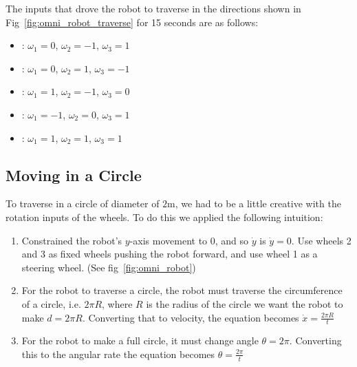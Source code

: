 \documentclass{article}
\begin{document}
The inputs that drove the robot to traverse in the directions shown in 
Fig~\ref{fig:omni_robot_traverse} for 15 seconds  are as follows:


\begin{itemize}
	\vspace{-0.4cm}
	\setlength{\itemsep}{0pt}
	\setlength{\parskip}{0pt}
	\setlength{\parsep}{0pt}
	
	\item{
		: 
		$\omega_{1} = 0$, $\omega_{2} = -1$, $\omega_{3} = 1$
	}
	\item{
		: 
		$\omega_{1} = 0$, $\omega_{2} = 1$, $\omega_{3} = -1$
	}
	\item{
		: 
		$\omega_{1} = 1$, $\omega_{2} = -1$, $\omega_{3} = 0$
	}
	\item{
		: 
		$\omega_{1} = -1$, $\omega_{2} = 0$, $\omega_{3} = 1$
	}
	\item{
		: 
		$\omega_{1} = 1$, $\omega_{2} = 1$, $\omega_{3} = 1$
	}
\end{itemize}



\newpage
\subsection{Moving in a Circle}
\label{subsec:traverse_circle}

To traverse in a circle of diameter of $2$m, we had to be a little creative
with the rotation inputs of the wheels. To do this we applied the following 
intuition:

\begin{enumerate}
	\vspace{-0.4cm}
	
    \item{Constrained the robot's $y$-axis movement to $0$, 
    and so $\dot{y}$ is $\dot{y} = 0$. Use wheels 2 and 3 as fixed wheels 
    pushing the robot forward, and use wheel 1 as a steering wheel. (See 
    fig~\ref{fig:omni_robot})}

    \item{For the robot to traverse a circle, the robot must traverse the
    circumference of a circle, i.e. $2 \pi R$, where $R$ is the radius of the 
    circle we want the robot to make $d = 2 \pi R$. Converting that to 
    velocity, the equation becomes $\dot{x} = \frac{2 \pi R}{t}$}

    \item{For the robot to make a full circle, it must change angle $\theta = 2 
    \pi$. Converting this to the angular rate the equation becomes 
    $\theta = \frac{2 \pi}{t}$}
    
   	\vspace{-0.4cm}
\end{enumerate}
\end{document}
